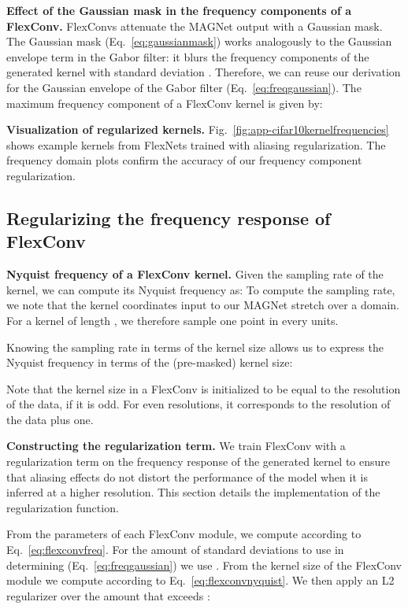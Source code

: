 \documentclass{article} \usepackage{iclr2022_conference,times}
\begin{document}
\textbf{Effect of the Gaussian mask in the frequency components of a FlexConv.} FlexConvs attenuate the MAGNet output with a Gaussian mask. The Gaussian mask (Eq.~\ref{eq:gaussianmask}) works analogously to the Gaussian envelope term in the Gabor filter: it blurs the frequency components of the generated kernel with standard deviation . Therefore, we can reuse our derivation for the Gaussian envelope of the Gabor filter (Eq.~\ref{eq:freqgaussian}). The maximum frequency component of a FlexConv kernel is given by:


\textbf{Visualization of regularized kernels.} Fig.~\ref{fig:app-cifar10kernelfrequencies} shows example kernels from FlexNets trained with aliasing regularization. The frequency domain plots confirm the accuracy of our frequency component regularization.

\subsection{Regularizing the frequency response of FlexConv}
\label{sec:magnetreg}

\textbf{Nyquist frequency of a FlexConv kernel.} Given the sampling rate  of the kernel, we can compute its Nyquist frequency  as:
To compute the sampling rate, we note that the kernel coordinates input to our MAGNet stretch over a  domain. For a kernel of length , we therefore sample one point in every  units.

Knowing the sampling rate in terms of the kernel size allows us to express the Nyquist frequency in terms of the (pre-masked) kernel size:

Note that the kernel size in a FlexConv is initialized to be equal to the resolution of the data, if it is odd. For even resolutions, it corresponds to the resolution of the data plus one.

\textbf{Constructing the regularization term.} We train FlexConv with a regularization term on the frequency response of the generated kernel to ensure that aliasing effects do not distort the performance of the model when it is inferred at a higher resolution. This section details the implementation of the regularization function.

From the parameters of each FlexConv module, we compute  according to Eq.~\ref{eq:flexconvfreq}. For the amount of standard deviations to use in determining  (Eq.~\ref{eq:freqgaussian}) we use . From the kernel size  of the FlexConv module we compute  according to Eq.~\ref{eq:flexconvnyquist}. We then apply an L2 regularizer over the amount that  exceeds :
\end{document}
